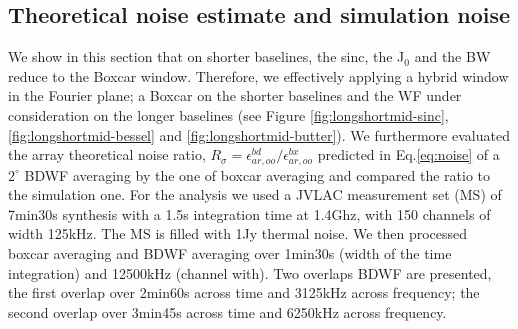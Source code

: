 \documentclass[useAMS,usenatbib]{mn2e}
\begin{document}
\subsection{Theoretical noise estimate and simulation noise}
\label{subsec:noise}
 We show in this section that on shorter baselines, the sinc, the J$_0$ and the BW reduce to the Boxcar window. 
Therefore, we effectively applying a hybrid window in the Fourier plane; a Boxcar on the shorter baselines 
and the WF under consideration on the longer baselines (see Figure \ref{fig:longshortmid-sinc}, \ref{fig:longshortmid-bessel} and 
\ref{fig:longshortmid-butter}). We furthermore evaluated the array
theoretical noise ratio, $R_{\sigma}=\epsilon_{ar,oo}^{bd}/\epsilon_{ar,oo}^{bx}$ predicted in Eq.\ref{eq:noise} of a $2^\circ$ BDWF 
averaging  by the one of boxcar averaging and compared the ratio to the simulation one. For the 
analysis we used a JVLAC measurement set (MS) of 7min30s synthesis with a 1.5s
integration time at 1.4Ghz, with 150 channels of width 125kHz. The MS is filled with 1Jy thermal noise. We then processed boxcar 
averaging and BDWF averaging over 1min30s (width of the time integration) and 12500kHz (channel with). Two overlaps BDWF are presented, 
the first overlap over 2min60s across time and 3125kHz across frequency; the second overlap over 3min45s across time and 6250kHz across 
frequency.
\end{document}
